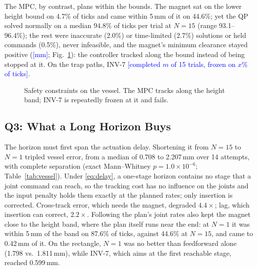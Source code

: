 \documentclass[journal]{IEEEtran}
\newcommand{\NEWRUN}[1]{\textcolor{blue}{[#1]}}
\newcommand{\figph}[3]{%
  \fbox{\parbox[c][#2][c]{\dimexpr#1-2\fboxsep-2\fboxrule\relax}{%
  \centering\footnotesize\textcolor{gray}{\textbf{Figure placeholder}}\\[2pt]
  \parbox{0.9\linewidth}{\centering\footnotesize\textcolor{gray}{#3}}}}}
\begin{document}
The MPC, by contrast, plans within the bounds. The magnet sat on the
lower height bound on 4.7\% of ticks and came within 5\,mm of it on
44.6\%; yet the QP solved
normally on a median 94.8\% of ticks per trial at $N=15$ (range
93.1--96.4\%); the rest were inaccurate (2.0\%) or time-limited (2.7\%)
solutions or held commands (0.5\%), never infeasible, and the magnet's
minimum
clearance stayed
positive (\NEWRUN{mm}; Fig.~\ref{fig:constraints}): the controller tracked
along the bound instead of being stopped at it. On the trap paths, INV-7
\NEWRUN{completed $m$ of 15 trials, frozen on $x$\% of ticks}.

\begin{figure}[t]
\centering
\figph{\columnwidth}{4.0cm}{(a) Height-band clearance versus path
progress: reference, MPC-SJ trials (band), INV-7 trials (lines ending where
each stopped), with INV-7's frozen ticks marked. (b) Per trial: fraction
of ticks with the band active and live solver status (MPC-SJ at $N=15$
and $N=1$, MPC-FJ), and fraction of frozen ticks (INV-7).}
\caption{Safety constraints on the vessel. The MPC tracks along the
height band; INV-7 is repeatedly frozen at it and fails.}
\label{fig:constraints}
\end{figure}

\subsection{Q3: What a Long Horizon Buys}
\label{sec:res-pred}

The horizon must first span the actuation delay. Shortening it from
$N=15$ to $N=1$ tripled vessel error, from a median of 0.708 to
2.207\,mm over 14 attempts, with complete separation (exact Mann--Whitney
$p=1.0\times10^{-6}$; Table~\ref{tab:vessel}). Under \eqref{eq:delay}, a
one-stage horizon contains no stage that a joint command can reach, so
the tracking cost has no influence on the joints and the input penalty
holds them exactly at the planned rates; only insertion is corrected.
Cross-track error, which needs the magnet, degraded $4.4\times$; lag,
which insertion can correct, $2.2\times$. Following the plan's joint rates
also kept the magnet close to the height band, where the plan itself runs
near the end: at $N=1$ it was within 5\,mm of the band on 87.6\% of ticks,
against 44.6\% at $N=15$, and came to 0.42\,mm of it. On the rectangle, $N=1$ was no better than feedforward alone
(1.798 vs.\ 1.811\,mm), while INV-7, which aims at the first reachable
stage, reached 0.599\,mm.
\end{document}
